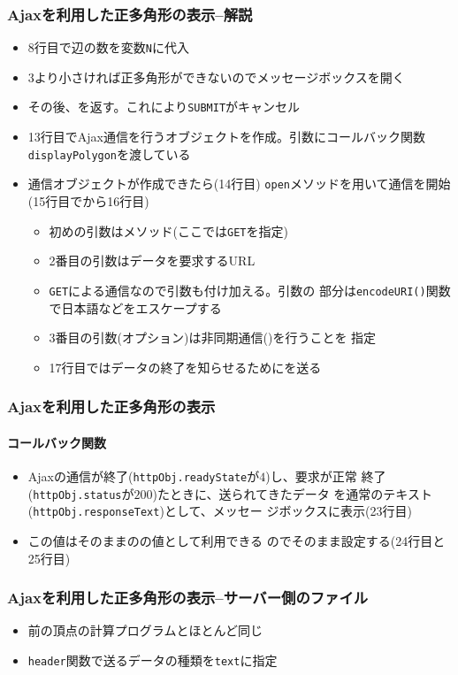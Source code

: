 \begin{frame}[containsverbatim]
 \frametitle{Ajaxを利用した正多角形の表示--解説}
 \begin{itemize}
	\item 8行目で辺の数を変数\texttt{N}に代入
	\item 3より小さければ正多角形ができないのでメッセージボックスを開く
	\item その後、を返す。これにより\texttt{SUBMIT}がキャンセル
  \item 13行目でAjax通信を行うオブジェクトを作成。引数にコールバック関数
        \texttt{displayPolygon}を渡している
  \item 通信オブジェクトが作成できたら(14行目)
        \texttt{open}メソッドを用いて通信を開始(15行目でから16行目)
        \begin{itemize}
  \item 初めの引数はメソッド(ここでは\texttt{GET}を指定)
  \item 2番目の引数はデータを要求するURL
  \item \texttt{GET}による通信なので引数も付け加える。引数の
        部分は\texttt{encodeURI()}関数で日本語などをエスケープする
  \item 3番目の引数(オプション)は非同期通信()を行うことを
        指定
  \item 17行目ではデータの終了を知らせるためにを送る
        \end{itemize}
 \end{itemize}
\end{frame}
\begin{frame}[containsverbatim]
 \frametitle{Ajaxを利用した正多角形の表示}
 \framesubtitle{コールバック関数}
 \begin{itemize}
  \item Ajaxの通信が終了(\texttt{httpObj.readyState}が$4$)し、要求が正常
        終了(\texttt{httpObj.status}が$200$)たときに、送られてきたデータ
        を通常のテキスト(\texttt{httpObj.responseText})として、メッセー
        ジボックスに表示(23行目)
  \item この値はそのままのの値として利用できる
        のでそのまま設定する(24行目と25行目)
 \end{itemize}
\end{frame}
\begin{frame}[containsverbatim]
 \frametitle{Ajaxを利用した正多角形の表示--サーバー側のファイル}
\begin{itemize}
 \item 前の頂点の計算プログラムとほとんど同じ
 \item \texttt{header}関数で送るデータの種類を\texttt{text}に指定
\end{itemize}
\end{frame}
